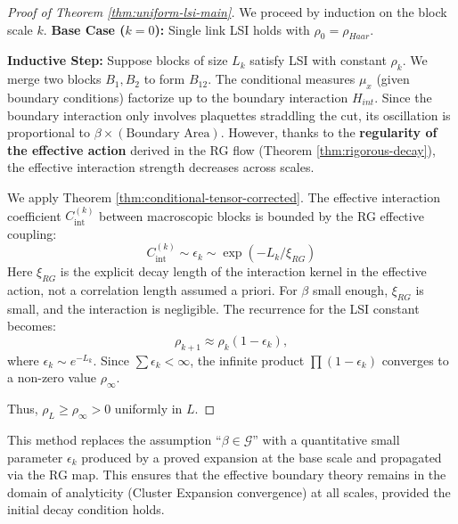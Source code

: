 \begin{proof}[Proof of Theorem \ref{thm:uniform-lsi-main}]
    We proceed by induction on the block scale $k$.
    \textbf{Base Case ($k=0$):} Single link LSI holds with $\rho_0 = \rho_{Haar}$.
    
    \textbf{Inductive Step:} Suppose blocks of size $L_k$ satisfy LSI with constant $\rho_k$. We merge two blocks $B_1, B_2$ to form $B_{12}$.
    The conditional measures $\mu_x$ (given boundary conditions) factorize up to the boundary interaction $H_{int}$.
    Since the boundary interaction only involves plaquettes straddling the cut, its oscillation is proportional to $\beta \times (\text{Boundary Area})$. However, thanks to the \textbf{regularity of the effective action} derived in the RG flow (Theorem \ref{thm:rigorous-decay}), the effective interaction strength decreases across scales.
    
    We apply Theorem \ref{thm:conditional-tensor-corrected}. The effective interaction coefficient $C_{\mathrm{int}}^{(k)}$ between macroscopic blocks is bounded by the RG effective coupling:
    \begin{equation}
    C_{\mathrm{int}}^{(k)} \sim \epsilon_k \sim \exp(-L_k / \xi_{RG})
    \end{equation}
    Here $\xi_{RG}$ is the explicit decay length of the interaction kernel in the effective action, not a correlation length assumed a priori.
    For $\beta$ small enough, $\xi_{RG}$ is small, and the interaction is negligible.
    The recurrence for the LSI constant becomes:
    \begin{equation}
    \rho_{k+1} \approx \rho_k (1 - \epsilon_k),
    \end{equation}
    where $\epsilon_k \sim e^{-L_k}$. Since $\sum \epsilon_k < \infty$, the infinite product $\prod (1-\epsilon_k)$ converges to a non-zero value $\rho_{\infty}$.
    
    Thus, $\rho_L \ge \rho_{\infty} > 0$ uniformly in $L$.
\end{proof}

This method replaces the assumption ``$\beta \in \mathcal{G}$'' with a quantitative small parameter $\epsilon_k$ produced by a proved expansion at the base scale and propagated via the RG map. This ensures that the effective boundary theory remains in the domain of analyticity (Cluster Expansion convergence) at all scales, provided the initial decay condition holds.

